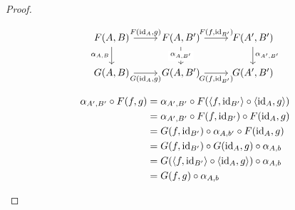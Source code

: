 \begin{theorem}
\begin{proof}
\begin{description}
        \[\begin{tikzcd}[ampersand replacement=\&]
          {F(A, B)} \& {F(A, B')} \& {F(A', B')} \\
          {G(A, B)} \& {G(A,B')} \& {G(A',B')}
          \arrow["{F(\id_A, g)}", from=1-1, to=1-2]
          \arrow["{F(f, \id_{B'})}", from=1-2, to=1-3]
          \arrow["{\alpha_{A, B}}"', from=1-1, to=2-1]
          \arrow["{G(\id_A, g)}"', from=2-1, to=2-2]
          \arrow["{\alpha_{A, B'}}"{description}, from=1-2, to=2-2]
          \arrow["{G(f, \id_{B'})}"', from=2-2, to=2-3]
          \arrow["{\alpha_{A', B'}}", from=1-3, to=2-3]
        \end{tikzcd}\]

        \[
          \begin{aligned}
            \alpha_{A', B'} \circ F(f, g)
            &= \alpha_{A', B'} \circ F(\langle f, \mathrm{id}_{B'}\rangle \circ \langle\mathrm{id}_A, g\rangle)\\
            &= \alpha_{A', B'} \circ F(f, \mathrm{id}_{B'}) \circ F(\mathrm{id}_A, g)\\
            &= G(f, \mathrm{id}_{B'}) \circ \alpha_{A, b'} \circ F(\mathrm{id}_A, g)\\
            &= G(f, \mathrm{id}_{B'}) \circ G(\mathrm{id}_A, g) \circ \alpha_{A, b}\\
            &= G(\langle f, \mathrm{id}_{B'}\rangle \circ \langle \mathrm{id}_A,g \rangle) \circ \alpha_{A, b}\\
            &= G(f, g) \circ \alpha_{A, b}
          \end{aligned}
        \]
    \end{description}
  \end{proof}
  \vspace{-\baselineskip}
\end{theorem}